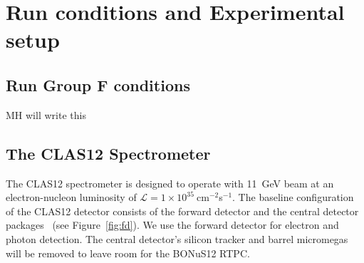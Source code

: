 \chapter{Run conditions and Experimental setup}
\label{chap:physics}

\section{Run Group F conditions}

MH will write this

\section{The CLAS12 Spectrometer}
The CLAS12 spectrometer is designed to operate with 11~GeV beam at an 
electron-nucleon luminosity of $\mathcal{L} = 
1\times10^{35}~$cm$^{-2}$s$^{-1}$. The baseline configuration of the CLAS12 
detector consists of the forward detector and the central detector 
packages~\cite{CD} (see Figure~\ref{fig:fd}). We use the forward detector for 
electron and photon detection. The central detector's silicon tracker and 
barrel micromegas will be removed to leave room for the BONuS12 RTPC.  

